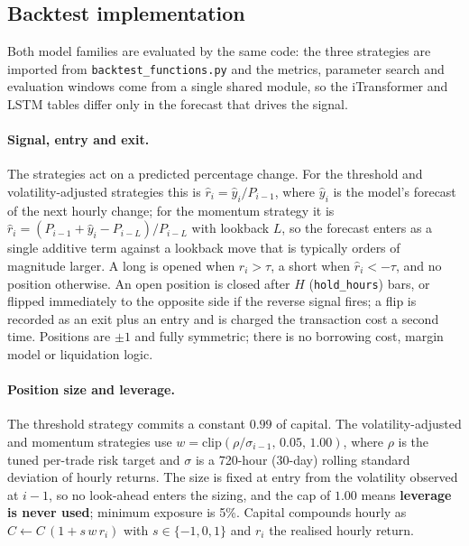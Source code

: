 
\subsection{Backtest implementation}

Both model families are evaluated by the same code: the three strategies are imported
from \texttt{backtest\_functions.py} and the metrics, parameter search and evaluation
windows come from a single shared module, so the iTransformer and LSTM tables differ
only in the forecast that drives the signal.

\paragraph{Signal, entry and exit.}
The strategies act on a predicted percentage change. For the threshold and
volatility-adjusted strategies this is $\hat{r}_i = \hat{y}_i / P_{i-1}$, where
$\hat{y}_i$ is the model's forecast of the next hourly change; for the momentum
strategy it is
$\hat{r}_i = (P_{i-1} + \hat{y}_i - P_{i-L}) / P_{i-L}$ with lookback $L$, so the
forecast enters as a single additive term against a lookback move that is typically
orders of magnitude larger. A long is opened when $\hat{r}_i > \tau$, a short when
$\hat{r}_i < -\tau$, and no position otherwise. An open position is closed after
$H$ (\texttt{hold\_hours}) bars, or flipped immediately to the opposite side if the
reverse signal fires; a flip is recorded as an exit plus an entry and is charged the
transaction cost a second time. Positions are $\pm 1$ and fully symmetric; there is no
borrowing cost, margin model or liquidation logic.

\paragraph{Position size and leverage.}
The threshold strategy commits a constant $0.99$ of capital. The volatility-adjusted
and momentum strategies use
$w = \mathrm{clip}\!\left(\rho / \sigma_{i-1},\, 0.05,\, 1.00\right)$,
where $\rho$ is the tuned per-trade risk target and $\sigma$ is a 720-hour (30-day)
rolling standard deviation of hourly returns. The size is fixed at entry from the
volatility observed at $i-1$, so no look-ahead enters the sizing, and the cap of
$1.00$ means \textbf{leverage is never used}; minimum exposure is 5\%. Capital
compounds hourly as $C \leftarrow C\,(1 + s\,w\,r_i)$ with $s \in \{-1,0,1\}$ and
$r_i$ the realised hourly return.

